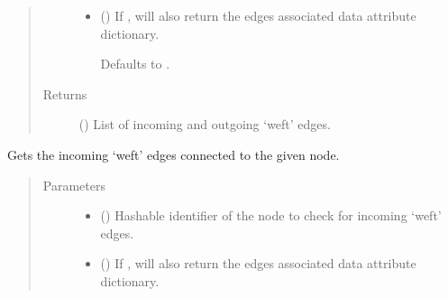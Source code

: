 \documentclass[letterpaper,10pt,english]{sphinxmanual}
\begin{document}
\begin{fulllineitems}
\begin{fulllineitems}
\begin{quote}
\begin{description}
\begin{itemize}
\item {} 
 (\sphinxstyleliteralemphasis{\sphinxupquote{, }}) \textendash{} 
If , will also return the edges associated data attribute
dictionary.

Defaults to .


\end{itemize}

\item[{Returns}] \leavevmode
{} () \textendash{} List of incoming and outgoing ‘weft’ edges.

\end{description}\end{quote}

\end{fulllineitems}


\begin{fulllineitems}
\label{\detokenize{cockatoo:cockatoo.KnitDiNetwork.node_weft_edges_in}}
Gets the incoming ‘weft’ edges connected to the given node.
\begin{quote}\begin{description}
\item[{Parameters}] \leavevmode\begin{itemize}
\item {} 
 () \textendash{} Hashable identifier of the node to check for incoming ‘weft’ edges.

\item {} 
 (\sphinxstyleliteralemphasis{\sphinxupquote{, }}) \textendash{} 
If , will also return the edges associated data attribute
dictionary.


\end{itemize}
\end{description}
\end{quote}
\end{fulllineitems}
\end{fulllineitems}
\end{document}
